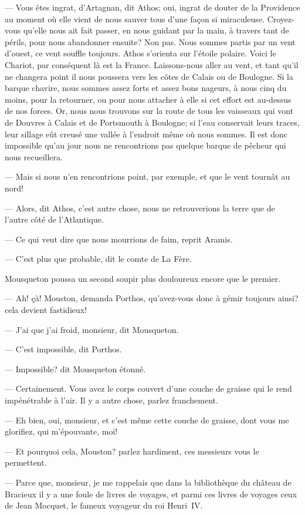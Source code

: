 — Vous êtes ingrat, d'Artagnan, dit Athos; oui, ingrat de douter de la Providence au moment où elle vient de nous sauver tous d'une façon si miraculeuse. Croyez-vous qu'elle nous ait fait passer, en nous guidant par la main, à travers tant de périls, pour nous abandonner ensuite? Non pas. Nous sommes partis par un vent d'ouest, ce vent souffle toujours. Athos s'orienta sur l'étoile polaire. Voici le Chariot, par conséquent là est la France. Laissons-nous aller au vent, et tant qu'il ne changera point il nous poussera vers les côtes de Calais ou de Boulogne. Si la barque chavire, nous sommes assez forts et assez bons nageurs, à nous cinq du moins, pour la retourner, ou pour nous attacher à elle si cet effort est au-dessus de nos forces. Or, nous nous trouvons sur la route de tous les vaisseaux qui vont de Douvres à Calais et de Portsmouth à Boulogne; si l'eau conservait leurs traces, leur sillage eût creusé une vallée à l'endroit même où nous sommes. Il est donc impossible qu'au jour nous ne rencontrions pas quelque barque de pêcheur qui nous recueillera.

— Mais si nous n'en rencontrions point, par exemple, et que le vent tournât au nord!

— Alors, dit Athos, c'est autre chose, nous ne retrouverions la terre que de l'autre côté de l'Atlantique.

— Ce qui veut dire que nous mourrions de faim, reprit Aramis.

— C'est plus que probable, dit le comte de La Fère.

Mousqueton poussa un second soupir plus douloureux encore que le premier.

— Ah! çà! Mouston, demanda Porthos, qu'avez-vous donc à gémir toujours ainsi? cela devient fastidieux!

— J'ai que j'ai froid, monsieur, dit Mousqueton.

— C'est impossible, dit Porthos.

— Impossible? dit Mousqueton étonné.

— Certainement. Vous avez le corps couvert d'une couche de graisse qui le rend impénétrable à l'air. Il y a autre chose, parlez franchement.

— Eh bien, oui, monsieur, et c'est même cette couche de graisse, dont vous me glorifiez, qui m'épouvante, moi!

— Et pourquoi cela, Mouston? parlez hardiment, ces messieurs vous le permettent.

— Parce que, monsieur, je me rappelais que dans la bibliothèque du château de Bracieux il y a une foule de livres de voyages, et parmi ces livres de voyages ceux de Jean Mocquet, le fameux voyageur du roi Henri~IV.

